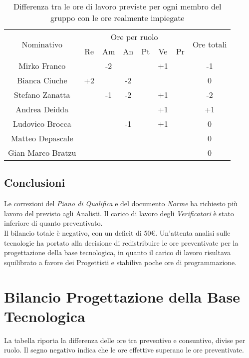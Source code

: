 \begin{flushleft}
    \begin{table}[!h]
	\begin{center}
		\begin{tabularx}{\textwidth}{|c|cccccc|c|}
			
			\hline
			\multirow{2}{*}{Nominativo} & \multicolumn{6}{c|}{Ore per ruolo} & \multirow{2}{*}{Ore totali} \\ \cline{2-7}
			& Re & Am & An & Pt & Ve & Pr &      \\ \hline
			\endhead
			Mirko Franco       &  & -2  & &  & +1 &   & -1   \\ \hline
			Bianca Ciuche      & +2 &    & -2 &    &  &   & 0   \\ \hline
			Stefano Zanatta    &   & -1 & -2 &  & +1 &  & -2    \\ \hline
			Andrea Deidda      &   &  &   &   & +1  &   & +1	\\ \hline
			Ludovico Brocca    &   &  & -1 &   & +1 &   & 0     \\ \hline
			Matteo Depascale   &   &  &   &   &   &   & 0  		\\ \hline
			Gian Marco Bratzu  &   &  &   &   &  &   & 0        \\ \hline
			
		\end{tabularx}
		\caption{Differenza tra le ore di lavoro previste per ogni membro del gruppo con le ore realmente impiegate }
	\end{center}
\end{table}

  \subsection{Conclusioni}
  Le correzioni del \textit{Piano di Qualifica} e del documento \textit{Norme} ha richiesto più lavoro del previsto agli {Analisti}. Il carico di lavoro degli \textit{Verificatori} è stato inferiore di quanto preventivato.\\ Il bilancio totale è negativo, con un deficit di 50\euro.
  Un'attenta analisi sulle tecnologie ha portato alla decisione di redistribuire le ore preventivate per la progettazione della base tecnologica, in quanto il carico di lavoro risultava squilibrato a favore dei Progettisti e stabiliva poche ore di programmazione.

\newpage	
	\section{Bilancio Progettazione della Base Tecnologica} 
	\label{BilProgBT}
  La tabella riporta la differenza delle ore tra preventivo e consuntivo, divise per ruolo. Il segno negativo indica che le ore effettive superano le ore preventivate.
  

\end{flushleft}
